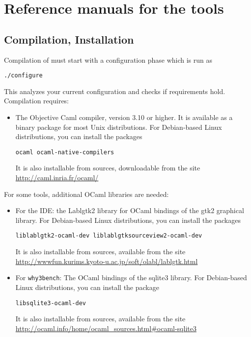 \chapter{Reference manuals for the \why tools}
\label{chap:manpages}

\section{Compilation, Installation}
\label{sec:install}

Compilation of \why must start with a configuration phase which is run as
\begin{verbatim}
./configure
\end{verbatim}
This analyzes your current configuration and checks if requirements hold.
Compilation requires:
\begin{itemize}
\item The Objective Caml compiler, version 3.10 or higher. It is
  available as a binary package for most Unix distributions. For
  Debian-based Linux distributions, you can install the packages
\begin{verbatim}
ocaml ocaml-native-compilers
\end{verbatim}
It is also installable from sources, downloadable from the site
\url{http://caml.inria.fr/ocaml/}
\end{itemize}

For some tools, additional OCaml libraries are needed:
\begin{itemize}
\item For the IDE: the Lablgtk2 library for OCaml bindings of the gtk2
  graphical library. For Debian-based Linux distributions, you can
  install the packages
\begin{verbatim}
liblablgtk2-ocaml-dev liblablgtksourceview2-ocaml-dev
\end{verbatim}
It is also installable from sources, available from the site
\url{http://wwwfun.kurims.kyoto-u.ac.jp/soft/olabl/lablgtk.html}

\item For \texttt{why3bench}: The OCaml bindings of the sqlite3 library.
For Debian-based Linux distributions, you can install the package
\begin{verbatim}
libsqlite3-ocaml-dev
\end{verbatim}
It is also installable from sources, available from the site
\url{http://ocaml.info/home/ocaml_sources.html#ocaml-sqlite3}
\end{itemize}

